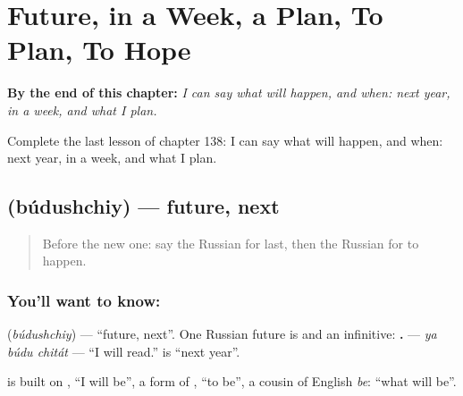 
\chapter{Future, in a Week, a Plan, To Plan, To Hope}
\label{ch:ru-future-in-a-week-a-plan-to-plan-to-hope}

\begin{chapteropening}
\textbf{By the end of this chapter:} \emph{I can say what will happen, and when: next year, in a week, and what I plan.}

Complete the last lesson of chapter 138: I can say what will happen, and when: next year, in a week, and what I plan.
\end{chapteropening}

\section[\texorpdfstring{\ru{будущий} (búdushchiy)}{будущий (búdushchiy)}]{ (búdushchiy) — future, next}

\label{lesson:RU-C138-budushchiy}



\begin{quote}
Before the new one: say the Russian for last, then the Russian for to happen.
\end{quote}

\subsection*{You'll want to know: }
\textbf{} (\emph{búdushchiy}) — \textquotedblleft{}future, next\textquotedblright{}. One Russian future is \textbf{} and an infinitive: \textbf{  .} — \emph{ya búdu chitát} — \textquotedblleft{}I will read.\textquotedblright{} \textbf{  } is \textquotedblleft{}next year\textquotedblright{}.

\begin{cousinweb}
\textbf{} is built on \emph{}, \textquotedblleft{}I will be\textquotedblright{}, a form of \emph{}, \textquotedblleft{}to be\textquotedblright{}, a cousin of English \emph{be}: \textquotedblleft{}what will be\textquotedblright{}.
\end{cousinweb}

